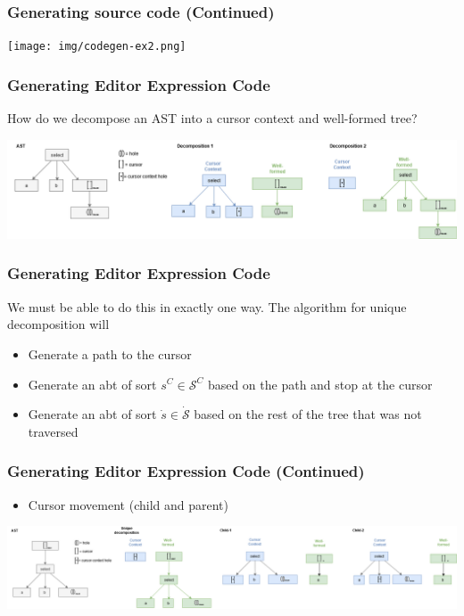 \documentclass[t,24pt,serif,aspectratio=169]{beamer}
\begin{document}
\begin{frame}[hvid]
    \frametitle{Generating source code (Continued)}
    \begin{center}
        \texttt{[image: img/codegen-ex2.png]}
    \end{center}
\end{frame}

\begin{frame}[hvid]
    \frametitle{Generating Editor Expression Code}
       How do we decompose an AST into a cursor context and well-formed tree? 
       
       \bigskip

       \includegraphics[width=1\textwidth]{img/slq-decompose-ex-wide.drawio.png}
\end{frame}


\begin{frame}[hvid]
    \frametitle{Generating Editor Expression Code}
       We must be able to do this in exactly one way. The
       algorithm for unique decomposition will
                  \begin{itemize}
                      \item Generate a path to the cursor
                      \item Generate an abt of sort $s^C \in \mathcal{S}^C$ based on the path and stop at the cursor
                      \item Generate an abt of sort $\dot{s} \in \dot{\mathcal{S}}$
                            based on the rest of the tree that was not traversed
                  \end{itemize}
\end{frame}

\begin{frame}[hvid]
    \frametitle{Generating Editor Expression Code (Continued)}
    \begin{itemize}
        \item Cursor movement (child and parent)
    \end{itemize}
    \includegraphics[width=1\textwidth]{img/sql-decomposition-and-movement.drawio.png}
\end{frame}
\end{document}
